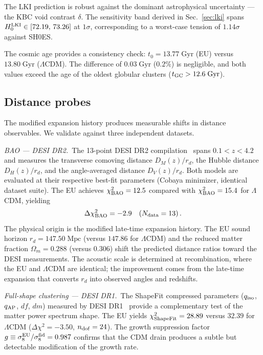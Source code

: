 \documentclass[a4paper,fleqn]{cas-dc}
\begin{document}
The LKI prediction is robust against the dominant
astrophysical uncertainty --- the KBC void contrast
$\delta$. The sensitivity band derived in
Sec.~\ref{sec:lki} spans $H_0^{\rm LKI} \in
[72.19,\, 73.26]$ at $1\sigma$, corresponding to a
worst-case tension of $1.14\sigma$ against SH0ES.

The cosmic age provides a consistency check:
$t_0 = 13.77\;\text{Gyr}$ (EU) versus
$13.80\;\text{Gyr}$ ($\Lambda$CDM). The difference
of $0.03\;\text{Gyr}$ ($0.2\%$) is negligible, and
both values exceed the age of the oldest globular
clusters ($t_{\rm GC} > 12.6\;\text{Gyr}$).

\subsection{Distance probes}
\label{sec:distance_probes}

The modified expansion history produces measurable
shifts in distance observables. We validate against
three independent datasets.

\textit{BAO --- DESI DR2.}~The 13-point DESI DR2
compilation~\cite{desi_dr2_2025} spans
$0.1 < z < 4.2$ and measures the transverse comoving
distance $D_M(z)/r_d$, the Hubble distance
$D_H(z)/r_d$, and the angle-averaged distance
$D_V(z)/r_d$. Both models are evaluated at their
respective best-fit parameters (Cobaya minimizer,
identical dataset suite). The EU achieves
$\chi^2_{\rm BAO} = 12.5$ compared with
$\chi^2_{\rm BAO} = 15.4$ for $\Lambda$CDM,
yielding
\begin{equation}
\Delta\chi^2_{\rm BAO} = -2.9
\quad (N_{\rm data} = 13)\,.
\label{eq:bao_dchi2}
\end{equation}
The physical origin is the modified late-time
expansion history. The EU sound horizon
$r_d = 147.50\;\text{Mpc}$ (versus $147.86$ for
$\Lambda$CDM) and the reduced matter fraction
$\Omega_m = 0.288$ (versus $0.306$) shift the
predicted distance ratios toward the DESI
measurements. The acoustic scale is determined at
recombination, where the EU and $\Lambda$CDM are
identical; the improvement comes from the
late-time expansion that converts $r_d$
into observed angles and redshifts.

\textit{Full-shape clustering --- DESI DR1.}~The
ShapeFit compressed parameters ($q_{\rm iso}$,
$q_{\rm AP}$, $df$, $dm$) measured by DESI
DR1~\cite{desi_dr1_shapefit} provide a complementary
test of the matter power spectrum shape. The EU
yields $\chi^2_{\rm ShapeFit} = 28.89$ versus
$32.39$ for $\Lambda$CDM
($\Delta\chi^2 = -3.50$, $n_{\rm dof} = 24$). The
growth suppression factor
$g \equiv \sigma_8^{\rm EU} / \sigma_8^{\rm fid}
= 0.987$ confirms that the CDM drain produces a
subtle but detectable modification of the growth
rate.
\end{document}
